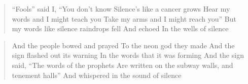   \begin{verse}
    ``Fools'' said I, ``You don't know
    Silence's like a cancer grows
    Hear my words and I might teach you
    Take my arms and I might reach you''
    But my words like silence raindrops fell
    And echoed
    In the wells of silence
  \end{verse}

  \begin{verse}
    And the people bowed and prayed
    To the neon god they made
    And the sign flashed out its warning
    In the words that it was forming
    And the sign said, ``The words of the prophets
    Are written on the subway walls, and tenement halls''
    And whispered in the sound of silence
  \end{verse}

\endsong
